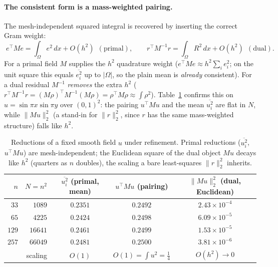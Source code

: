 \documentclass[11pt]{article}
\begin{document}
\paragraph{The consistent form is a mass-weighted pairing.} The mesh-independent squared integral
is recovered by inserting the correct Gram weight:
\begin{equation}
  \boxed{\;
  e^\top M e=\int_\Omega e^2\,dx+O(h^2)\ \ (\text{primal}),
  \qquad
  r^\top M^{-1} r=\int_\Omega R^2\,dx+O(h^2)\ \ (\text{dual}).
  \;}
  \label{eq:consistent-norms}
\end{equation}
For a primal field $M$ supplies the $h^2$ quadrature weight ($e^\top Me\approx h^2\sum_i e_i^2$;
on the unit square this equals $\overline{e_i^2}$ up to $|\Omega|$, so the plain mean is
\emph{already} consistent). For a dual residual $M^{-1}$ \emph{removes} the extra $h^2$
($r^\top M^{-1}r=(M\rho)^\top M^{-1}(M\rho)=\rho^\top M\rho\approx\int\rho^2$). Table~\ref{tab:scaling}
confirms this on $u=\sin\pi x\sin\pi y$ over $(0,1)^2$: the pairing $u^\top Mu$ and the mean
$\overline{u_i^2}$ are flat in $N$, while $\|Mu\|_2^2$ (a stand-in for $\|r\|_2^2$, since $r$ has
the same mass-weighted structure) falls like $h^2$.

\begin{table}[ht]
\centering
\begin{tabular}{r r c c c}
\hline
$n$ & $N=n^2$ & $\overline{u_i^2}$ (primal, mean) & $u^\top Mu$ (pairing) & $\|Mu\|_2^2$ (dual, Euclidean)\\
\hline
$33$  & $1089$  & $0.2351$ & $0.2492$ & $2.43\times10^{-4}$\\
$65$  & $4225$  & $0.2424$ & $0.2498$ & $6.09\times10^{-5}$\\
$129$ & $16641$ & $0.2461$ & $0.2499$ & $1.53\times10^{-5}$\\
$257$ & $66049$ & $0.2481$ & $0.2500$ & $3.81\times10^{-6}$\\
\hline
\multicolumn{2}{r}{scaling} & $O(1)$ & $O(1)=\int u^2=\tfrac14$ & $O(h^2)\to0$\\
\hline
\end{tabular}
\caption{Reductions of a fixed smooth field $u$ under refinement. Primal reductions
($\overline{u_i^2}$, $u^\top Mu$) are mesh-independent; the Euclidean square of the dual object
$Mu$ decays like $h^2$ (quarters as $n$ doubles), the scaling a bare least-squares $\|r\|_2^2$
inherits.}
\label{tab:scaling}
\end{table}
\end{document}
